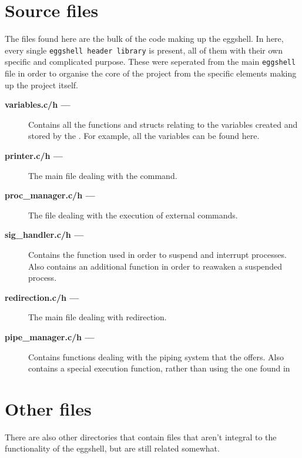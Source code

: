 \documentclass[12pt, a4paper]{report}
\begin{document}
        \section{Source files}
            The files found here are the bulk of the code making up the 
            eggshell. In here, every single \texttt{eggshell header library}
            is present, all of them with their own specific and complicated purpose.
            These were seperated from the main \texttt{eggshell} file 
            in order to organise the core of the project from the 
            specific elements making up the project itself.

            \begin{description}
                \item[\bf{variables.c/h} ---]
                    Contains all the functions and structs relating to the
                    variables created and stored by the . 
                    For example, all the  variables can be found
                    here.
                \item[\bf{printer.c/h} ---]
                    The main file dealing with the  command.
                \item[\bf{proc\_manager.c/h} ---]
                    The file dealing with the execution of external commands.
                \item[\bf{sig\_handler.c/h} ---]
                    Contains the  function used in order 
                    to suspend and interrupt processes. Also contains an 
                    additional function in order to reawaken a suspended
                    process.
                \item[\bf{redirection.c/h} ---]
                    The main file dealing with  redirection.
                \item[\bf{pipe\_manager.c/h} ---]
                    Contains functions dealing with the piping system that the
                     offers. Also contains a special execution function,
                    rather than using the one found in 
            \end{description}
        
        \section{Other files}
            There are also other directories that contain files that aren't
            integral to the functionality of the eggshell, but are still related
            somewhat.
\end{document}
